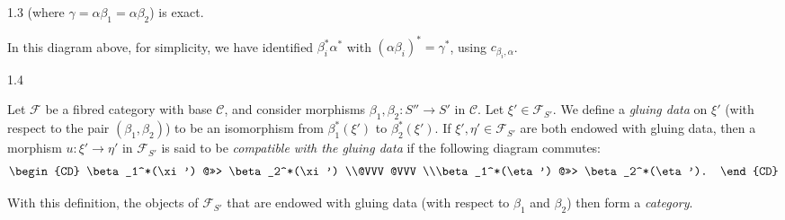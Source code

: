 \begin{definition}{1.3}
    (where \(\gamma =\alpha \beta _1=\alpha \beta _2\)) is exact.\par{}In this diagram above, for simplicity, we have identified \(\beta _i^*\alpha ^*\) with \((\alpha \beta _i)^*=\gamma ^*\), using \(c_{\beta _i,\alpha }\).\end{definition}\begin{definition}{1.4}\label{fga3.i-a.1-definition-1.4}\skipsinglepar\par{}Let \(\mathcal {F}\) be a fibred category with base \(\mathcal {C}\), and consider morphisms \(\beta _1,\beta _2\colon  S''\to  S'\) in \(\mathcal {C}\).
    Let \(\xi '\in \mathcal {F}_{S'}\).
    We define a \emph{gluing data} on \(\xi '\) (with respect to the pair \((\beta _1,\beta _2)\)) to be an isomorphism from \(\beta _1^*(\xi ')\) to \(\beta _2^*(\xi ')\).
    If \(\xi ',\eta '\in \mathcal {F}_{S'}\) are both endowed with gluing data, then a morphism \(u\colon \xi '\to \eta '\) in \(\mathcal {F}_{S'}\) is said to be \emph{compatible with the gluing data} if the following diagram commutes:
    \[       \begin {CD}         \beta _1^*(\xi ') @>>> \beta _2^*(\xi ')       \\@VVV @VVV       \\\beta _1^*(\eta ') @>>> \beta _2^*(\eta ').       \end {CD}     \]\end{definition}\par{}With this definition, the objects of \(\mathcal {F}_{S'}\) that are endowed with gluing data (with respect to \(\beta _1\) and \(\beta _2\)) then form a \emph{category}.
  
